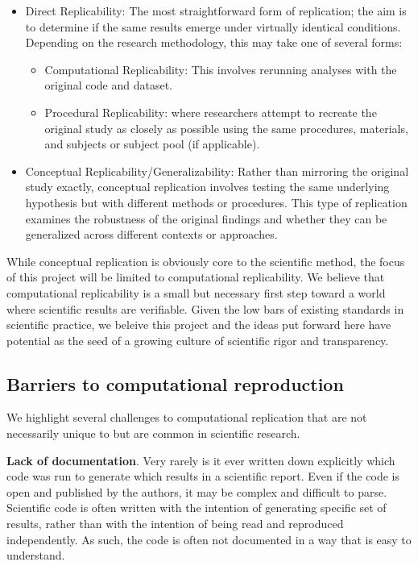 \begin{itemize}
\itemsep -0.2em
\item Direct Replicability:  The most straightforward form of replication; the aim is to determine if the same results emerge under virtually identical conditions. Depending on the research methodology, this may take one of several forms:

\begin{itemize}
\itemsep -0.2em
\item Computational Replicability: This involves rerunning analyses with the original code and dataset.
\item Procedural Replicability: where researchers attempt to recreate the original study as closely as possible using the same procedures, materials, and subjects or subject pool (if applicable).
\end{itemize}
\item Conceptual Replicability/Generalizability: Rather than mirroring the original study exactly, conceptual replication involves testing the same underlying hypothesis but with different methods or procedures. This type of replication examines the robustness of the original findings and whether they can be generalized across different contexts or approaches.
\end{itemize}

While conceptual replication is obviously core to the scientific method, the focus of this project will be limited to computational replicability. We believe that computational replicability is a small but necessary first step toward a world where scientific results are verifiable. Given the low bars of existing standards in scientific practice, we beleive this project and the ideas put forward here have potential as the seed of a growing culture of scientific rigor and transparency.

\hypertarget{barriers-to-computational-reproduction}{%
\subsection{Barriers to computational reproduction}\label{barriers-to-computational-reproduction}}

We highlight several challenges to computational replication that are not necessarily unique to but are common in scientific research. 

\textbf{Lack of documentation}. Very rarely is it ever written down explicitly which code was run to generate which results in a scientific report. Even if the code is open and published by the authors, it may be complex and difficult to parse. Scientific code is often written with the intention of generating specific set of results, rather than with the intention of being read and reproduced independently. As such, the code is often not documented in a way that is easy to understand.

